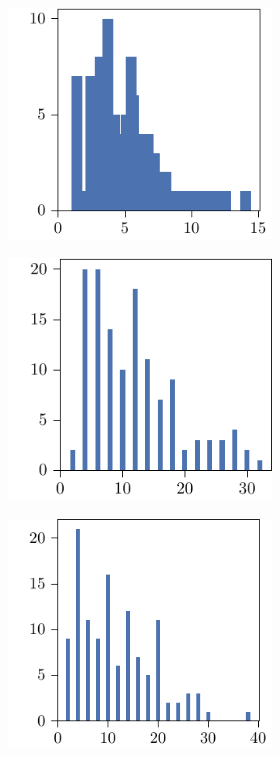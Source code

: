 \begin{figure}[p]
\begin{subfigure}{\textwidth}
\begin{subfigure}{\mymultiouter}
    \end{subfigure}
    \begin{subfigure}{\mymultiouter}
        \centering
          \includegraphics[width=\mymultiinner]{figures/new/eucledian-wine-permutation-retraining}
      \end{subfigure}
  \end{subfigure}
  \centering
  \begin{subfigure}{\textwidth}
    \centering
    \begin{subfigure}{\mymultiouter}
        \centering
          \includegraphics[width=\mymultiinner]{figures/new/manhattan-wine-qlibra-permutation}
    \end{subfigure}
    \begin{subfigure}{\mymultiouter}
        \centering
          \includegraphics[width=\mymultiinner]{figures/new/manhattan-wine-qlibra-retraining}

\end{subfigure}
\end{subfigure}
\end{figure}
